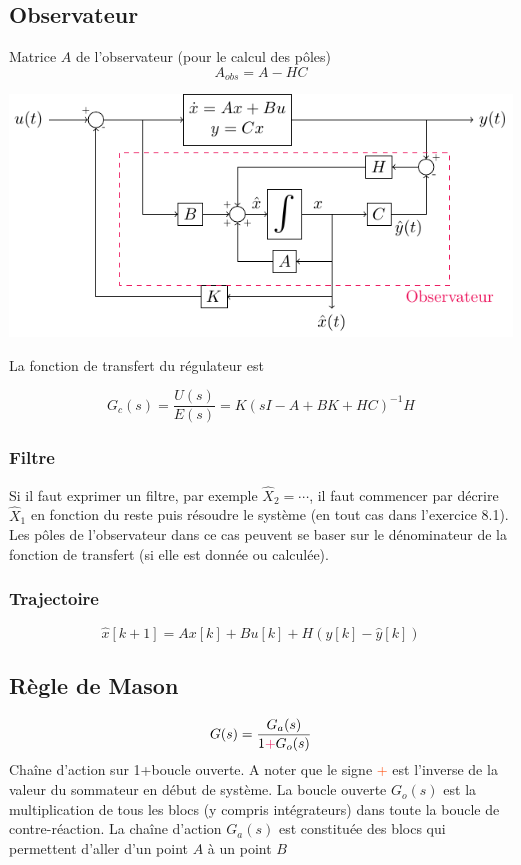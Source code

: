 \documentclass[resume]{subfiles}
\begin{document}
\subsection{Observateur}
Matrice $A$ de l'observateur (pour le calcul des pôles)
$$A_{obs}=A-HC$$
\begin{center}
\includegraphics[width=\columnwidth]{drwg_5.pdf}
\end{center}
La fonction de transfert du régulateur est

$$G_c(s)=\frac{U(s)}{E(s)}=K\left(sI-A+BK+HC\right)^{-1}H$$


\subsubsection{Filtre}
Si il faut exprimer un filtre, par exemple $\hat{X}_2=\cdots$, il faut commencer par décrire $\hat{X}_1$ en fonction du reste puis résoudre le système (en tout cas dans l'exercice 8.1).\\
Les pôles de l'observateur dans ce cas peuvent se baser sur le dénominateur de la fonction de transfert (si elle est donnée ou calculée).

\subsubsection{Trajectoire}
$$\boxed{\hat{x}[k+1]=Ax[k] + Bu[k] + H\left(y[k] - \hat{y}[k]\right)}$$

\subsection{Règle de Mason}
$$G(s)=\frac{G_a(s)}{1\textcolor{OrangeRed}{+}G_o(s)}$$
Chaîne d'action sur 1+boucle ouverte. A noter que le signe \textcolor{OrangeRed}{+} est l'inverse de la valeur du sommateur en début de système. La boucle ouverte $G_o(s)$ est la multiplication de tous les blocs (y compris intégrateurs) dans toute la boucle de contre-réaction. La chaîne d'action $G_a(s)$ est constituée des blocs qui permettent d'aller d'un point $A$ à un point $B$
\end{document}
